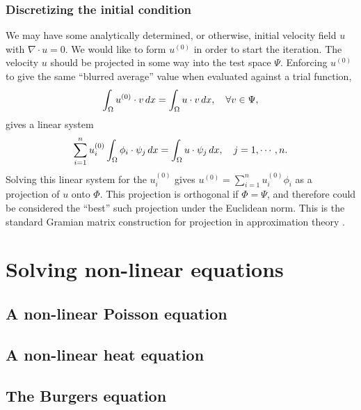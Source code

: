 \subsubsection{Discretizing the initial condition}
We may have some analytically determined, or otherwise, initial velocity field $u$ with $\nabla\cdot u = 0$.
We would like to form $u^{(0)}$ in order to start the iteration. The velocity $u$ should be projected in some way into the test space $\Psi$.
Enforcing $u^{(0)}$ to give the same ``blurred average'' value when evaluated against a trial function,
\begin{equation}\label{initial_velocity_projection}
    \int_{\Omega} u^{(0)}\cdot v\,dx = \int_{\Omega} u \cdot v\,dx,\quad \forall v \in \Psi,
\end{equation}
gives a linear system
\begin{equation}\label{initial_velocity_projection_linear_system}
    \sum_{i=1}^n u^{(0)}_i \int_{\Omega} \phi_i \cdot \psi_j\,dx = \int_{\Omega} u\cdot \psi_j\,dx,
    \quad j=1,\cdots,n.
\end{equation}
Solving this linear system for the $u^{(0)}_i$ gives $u^{(0)} = \sum_{i=1}^n u^{(0)}_i \phi_i$ as a projection of $u$ onto $\Phi$.
This projection is orthogonal if $\Phi = \Psi$, and therefore could be considered the ``best'' such projection under the Euclidean norm.
This is the standard Gramian matrix construction for projection in approximation theory \cite{approximation_theory}.


\section{Solving non-linear equations}
\subsection{A non-linear Poisson equation}
\subsection{A non-linear heat equation}
\subsection{The Burgers equation}


